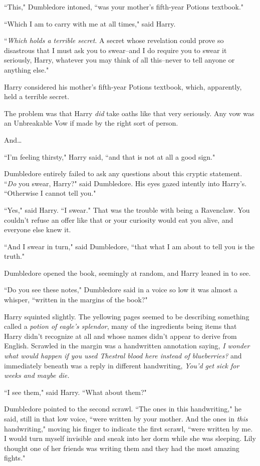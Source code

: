 ``This," Dumbledore intoned, ``was your mother's fifth-year Potions textbook."

``Which I am to carry with me at all times," said Harry.

``\emph{Which holds a terrible secret}. A secret whose revelation could prove so disastrous that I must ask you to swear\---and I do require you to swear it seriously, Harry, whatever you may think of all this\---never to tell anyone or anything else."

Harry considered his mother's fifth-year Potions textbook, which, apparently, held a terrible secret.

The problem was that Harry \emph{did} take oaths like that very seriously. Any vow was an Unbreakable Vow if made by the right sort of person.

And{\ldots}

``I'm feeling thirsty," Harry said, ``and that is not at all a good sign."

Dumbledore entirely failed to ask any questions about this cryptic statement. ``\emph{Do} you swear, Harry?" said Dumbledore. His eyes gazed intently into Harry's. ``Otherwise I cannot tell you."

``Yes," said Harry. ``I swear." That was the trouble with being a Ravenclaw. You couldn't refuse an offer like that or your curiosity would eat you alive, and everyone else knew it.

``And I swear in turn," said Dumbledore, ``that what I am about to tell you is the truth."

Dumbledore opened the book, seemingly at random, and Harry leaned in to see.

``Do you see these notes," Dumbledore said in a voice so low it was almost a whisper, ``written in the margins of the book?"

Harry squinted slightly. The yellowing pages seemed to be describing something called a \emph{potion of eagle's splendor}, many of the ingredients being items that Harry didn't recognize at all and whose names didn't appear to derive from English. Scrawled in the margin was a handwritten annotation saying, \emph{I wonder what would happen if you used Thestral blood here instead of blueberries?} and immediately beneath was a reply in different handwriting, \emph{You'd get sick for weeks and maybe die.}

``I see them," said Harry. ``What about them?"

Dumbledore pointed to the second scrawl. ``The ones in this handwriting," he said, still in that low voice, ``were written by your mother. And the ones in \emph{this} handwriting," moving his finger to indicate the first scrawl, ``were written by me. I would turn myself invisible and sneak into her dorm while she was sleeping. Lily thought one of her friends was writing them and they had the most amazing fights."

